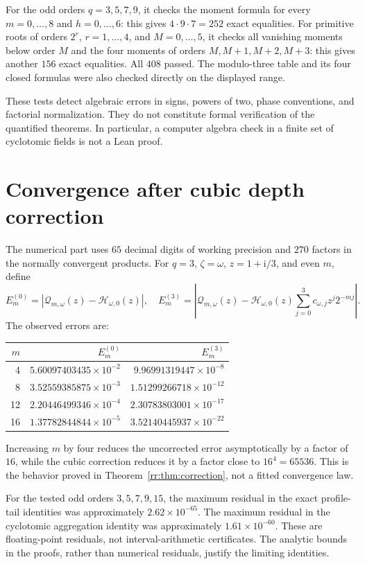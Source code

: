\documentclass[11pt,a4paper,oneside,openany]{book}
\numberwithin{equation}{chapter}
\theoremstyle{definition}
\theoremstyle{remark}
\newcommand{\ii}{\mathrm i}
\newcommand{\Hp}{\mathcal H}
\newcommand{\Qp}{\mathcal Q}
\begin{document}
For the odd orders \(q=3,5,7,9\), it checks the moment formula for every \(m=0,\ldots,8\) and \(h=0,\ldots,6\): this gives \(4\cdot9\cdot7=252\) exact equalities. For primitive roots of orders \(2^r\), \(r=1,\ldots,4\), and \(M=0,\ldots,5\), it checks all vanishing moments below order \(M\) and the four moments of orders \(M,M+1,M+2,M+3\): this gives another \(156\) exact equalities. All \(408\) passed. The modulo-three table and its four closed formulas were also checked directly on the displayed range.

These tests detect algebraic errors in signs, powers of two, phase conventions, and factorial normalization. They do not constitute formal verification of the quantified theorems. In particular, a computer algebra check in a finite set of cyclotomic fields is not a Lean proof.

\section{Convergence after cubic depth correction}
The numerical part uses \(65\) decimal digits of working precision and \(270\) factors in the normally convergent products. For \(q=3\), \(\zeta=\omega\), \(z=1+\ii/3\), and even \(m\), define
\[
 E_m^{(0)}=|\Qp_{m,\omega}(z)-\Hp_{\omega,0}(z)|,
 \quad
 E_m^{(3)}=\left|\Qp_{m,\omega}(z)-\Hp_{\omega,0}(z)
                \sum_{j=0}^3c_{\omega,j}z^j2^{-mj}\right|.
\]
The observed errors are:
\begin{center}
\begin{tabular}{rrr}
\toprule
\(m\)&\(E_m^{(0)}\)&\(E_m^{(3)}\)\\
\midrule
4&\(5.60097403435\times10^{-2}\)&\(9.96991319447\times10^{-8}\)\\
8&\(3.52559385875\times10^{-3}\)&\(1.51299266718\times10^{-12}\)\\
12&\(2.20446499346\times10^{-4}\)&\(2.30783803001\times10^{-17}\)\\
16&\(1.37782844844\times10^{-5}\)&\(3.52140445937\times10^{-22}\)\\
\bottomrule
\end{tabular}
\end{center}
Increasing \(m\) by four reduces the uncorrected error asymptotically by a factor of \(16\), while the cubic correction reduces it by a factor close to \(16^4=65536\). This is the behavior proved in Theorem~\ref{rr:thm:correction}, not a fitted convergence law.

For the tested odd orders \(3,5,7,9,15\), the maximum residual in the exact profile-tail identities was approximately \(2.62\times10^{-65}\). The maximum residual in the cyclotomic aggregation identity was approximately \(1.61\times10^{-60}\). These are floating-point residuals, not interval-arithmetic certificates. The analytic bounds in the proofs, rather than numerical residuals, justify the limiting identities.
\end{document}
